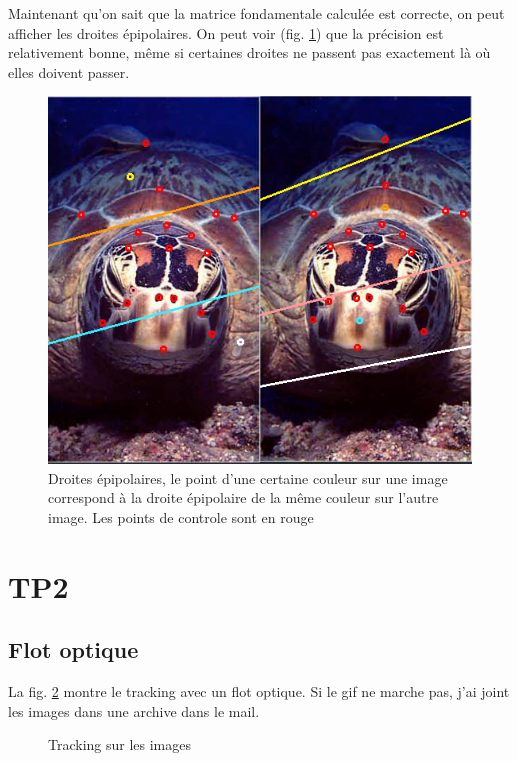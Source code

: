 \documentclass [a4 paper,11pt]{article}
\begin{document}
Maintenant qu'on sait que la matrice fondamentale calculée est correcte, on peut afficher les droites épipolaires. On peut voir (fig. \ref{fig:droite}) que la précision est relativement bonne, même si certaines droites ne passent pas exactement là où elles doivent passer.

\begin{figure}
  \centering
  \includegraphics[width=0.8\linewidth]{ptsepipole.png}
  \caption{Droites épipolaires, le point d'une certaine couleur sur une image correspond à la droite épipolaire de la même couleur sur l'autre image. Les points de controle sont en rouge}
  \label{fig:droite}
\end{figure}%

\newpage
\section{TP2}
\subsection{Flot optique}
La fig. \ref{fig:ghost} montre le tracking avec un flot optique. Si le gif ne marche pas, j'ai joint les images dans une archive dans le mail.
\newpage
\begin{figure}
\centering
{}
\caption{Tracking sur les images}
\label{fig:ghost}
\end{figure}
\end{document}
